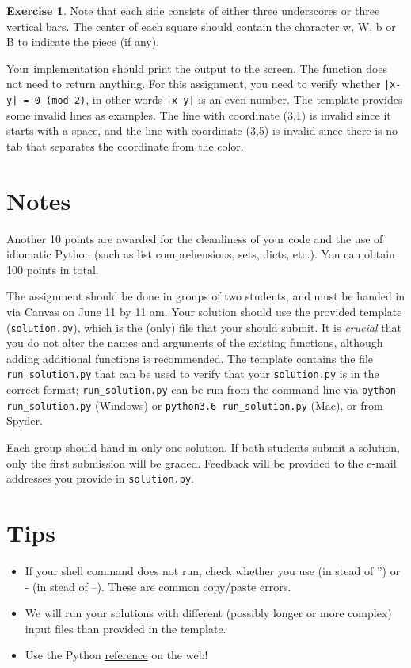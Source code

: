 \documentclass[11pt]{article}
\theoremstyle{definition}
\newtheorem{exercise}{Exercise}
\begin{document}
\begin{exercise}
	\noindent Note that each side consists of either three underscores or three vertical bars. The center of each square should contain the character w, W, b or B to indicate the piece (if any).
		
	Your implementation should print the output to the screen. The function does not need to return anything. For this assignment, you need to verify whether \texttt{|x-y| = 0 (mod 2)}, in other words \texttt{|x-y|} is an even number. The template provides some invalid
	lines as examples. The line with coordinate (3,1) is invalid since it starts with a space, and the line with coordinate (3,5) is invalid	since there is no tab that separates the coordinate from the color.
\end{exercise}

\section*{Notes}
Another 10 points are awarded for the cleanliness of your code and the use of idiomatic Python (such as list comprehensions, sets, dicts,
etc.). You can obtain 100 points in total.

The assignment should be done in groups of two students, and must be handed in via Canvas on June 11 by 11 am. Your solution should use the provided template (\texttt{solution.py}), which is the (only) file that your should submit. It is \emph{crucial} that you do not alter the names and arguments of the existing functions, although adding additional functions is recommended. The template contains the file \texttt{run\_solution.py} that can be used to verify that your \texttt{solution.py} is in the correct format; \texttt{run\_solution.py} can be run from the command line via \texttt{python run\_solution.py} (Windows) or \texttt{python3.6 run\_solution.py} (Mac), or from Spyder.

Each group should hand in only one solution. If both students submit a solution, only the first submission will be graded. Feedback will be provided to the e-mail addresses you provide in \texttt{solution.py}.

\section*{Tips}

\begin{itemize}
	\setlength\itemsep{1mm}
	\item If your shell command does not run, check whether you use \textquotedbl{} (in stead of ”) or - (in stead of –). These are common copy/paste errors.
	\item We will run your solutions with different (possibly longer or more complex) input files than provided in the template.
	\item Use the Python \href{https://docs.python.org/3/}{reference} on the web!
\end{itemize}
\end{document}
